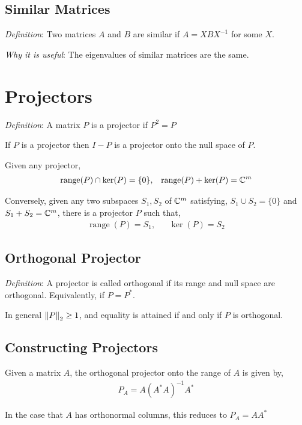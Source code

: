 \documentclass[12pt]{article}
\begin{document}
\subsection{Similar Matrices}
\textit{Definition}: Two matrices \( A \) and \( B \) are similar if \( A = XBX^{-1} \) for some \( X \).

\textit{Why it is useful}: The eigenvalues of similar matrices are the same.

\pagebreak
\section{Projectors}
\textit{Definition}: A matrix \( P \) is a projector if \( P^2 = P \)

If \( P \) is a projector then \( I-P \) is a projector onto the null space of \( P \).

Given any projector,
\begin{align*}
    \operatorname{range}(P) \cap \operatorname{ker}(P) = \{0\}
    ,&&
    \operatorname{range}(P) + \operatorname{ker}(P) = \mathbb{C}^{m}
\end{align*}

Conversely, given any two subspaces \( S_1,S_2 \) of \( \mathbb{C}^m \) satisfying, \( S_1\cup S_2 = \{0\} \) and \( S_1+S_2=\mathbb{C}^m \), there is a projector \( P \) such that,
\begin{align*}
    \operatorname{range}(P) = S_1, &&
    \operatorname{ker}(P) = S_2
\end{align*}

\subsection{Orthogonal Projector}
\textit{Definition}: A projector is called orthogonal if its range and null space are orthogonal. Equivalently, if \( P = P^* \).

In general \( \left\lVert P\right\rVert_2 \geq 1 \), and equality is attained if and only if \( P \) is orthogonal.

\subsection{Constructing Projectors}
Given a matrix \( A \), the orthogonal projector onto the range of \( A \) is given by,
\begin{align*}
    P_A = A(A^*A)^{-1}A^*
\end{align*}

In the case that \( A \) has orthonormal columns, this reduces to \( P_A = AA^* \)
\end{document}
